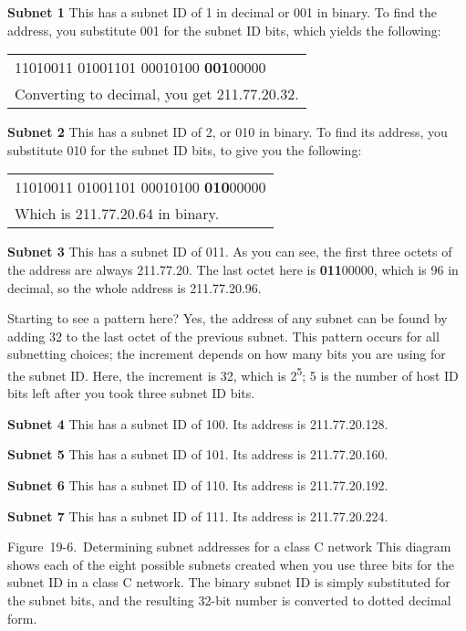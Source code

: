 {\textbf{Subnet 1}} This has a subnet ID of 1 in decimal or 001 in
binary. To find the address, you substitute 001 for the subnet ID bits,
which yields the following:

\begin{longtable}[]{@{}l@{}}
\toprule
\endhead
11010011 01001101 00010100 {\textbf{001}}00000\tabularnewline
Converting to decimal, you get 211.77.20.32.\tabularnewline
\bottomrule
\end{longtable}

{\textbf{Subnet 2}} This has a subnet ID of 2, or 010 in binary. To find
its address, you substitute 010 for the subnet ID bits, to give you the
following:

\begin{longtable}[]{@{}l@{}}
\toprule
\endhead
11010011 01001101 00010100 {\textbf{010}}00000\tabularnewline
Which is 211.77.20.64 in binary.\tabularnewline
\bottomrule
\end{longtable}

{\textbf{Subnet 3}} This has a subnet ID of 011. As you can see, the
first three octets of the address are always 211.77.20. The last octet
here is {\textbf{011}}00000, which is 96 in decimal, so the whole
address is 211.77.20.96.

Starting to see a pattern here? Yes, the address of any subnet can be
found by adding 32 to the last octet of the previous subnet. This
pattern occurs for all subnetting choices; the increment depends on how
many bits you are using for the subnet ID. Here, the increment is 32,
which is 2\textsuperscript{5}; 5 is the number of host ID bits left
after you took three subnet ID bits.

{\textbf{Subnet 4}} This has a subnet ID of 100. Its address is
211.77.20.128.

{\textbf{Subnet 5}} This has a subnet ID of 101. Its address is
211.77.20.160.

{\textbf{Subnet 6}} This has a subnet ID of 110. Its address is
211.77.20.192.

{\textbf{Subnet 7}} This has a subnet ID of 111. Its address is
211.77.20.224.

\protect\hypertarget{ch19s04.htmlux5cux23determining_subnet_addresses_for_a_class}{}{}

\protect\hypertarget{ch19s04.htmlux5cux23I_mediaobject5_d1e20949}{}{}

Figure~19-6.~Determining subnet addresses for a class C network This
diagram shows each of the eight possible subnets created when you use
three bits for the subnet ID in a class C network. The binary subnet ID
is simply substituted for the subnet bits, and the resulting 32-bit
number is converted to dotted decimal form.


